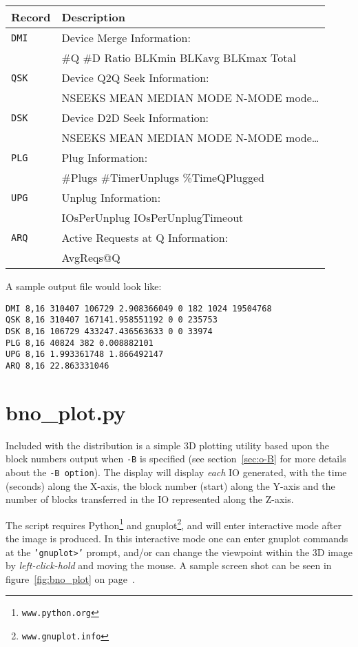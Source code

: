 \documentclass{article}
\begin{document}
  \bigskip
  \begin{tabular}{|l|l|}\hline
  \textbf{Record} & \textbf{Description}\\\hline
  \texttt{DMI}	& Device Merge Information:\\
		& \#Q \#D Ratio BLKmin BLKavg BLKmax Total\\\hline
  \texttt{QSK}	& Device Q2Q Seek Information:\\
		& NSEEKS MEAN MEDIAN MODE N-MODE mode\ldots\\\hline
  \texttt{DSK}	& Device D2D Seek Information:\\
		& NSEEKS MEAN MEDIAN MODE N-MODE mode\ldots\\\hline
  \texttt{PLG}	& Plug Information:\\
		& \#Plugs \#TimerUnplugs \%TimeQPlugged\\\hline
  \texttt{UPG}	& Unplug Information:\\
		& IOsPerUnplug IOsPerUnplugTimeout\\\hline
  \texttt{ARQ}	& Active Requests at Q Information:\\
  		& AvgReqs@Q\\\hline
  \end{tabular}

  \bigskip
  A sample output file would look like:

  \begin{verbatim}
DMI 8,16 310407 106729 2.908366049 0 182 1024 19504768
QSK 8,16 310407 167141.958551192 0 0 235753
DSK 8,16 106729 433247.436563633 0 0 33974
PLG 8,16 40824 382 0.008882101
UPG 8,16 1.993361748 1.866492147
ARQ 8,16 22.863331046
  \end{verbatim}

\newpage\section{\label{sec:bno_plot}bno\_plot.py}

Included with the distribution is a simple 3D plotting utility based
upon the block numbers output when \texttt{-B} is specified (see
section~\ref{sec:o-B} for more details about the \texttt{-B option}). The
display will display \emph{each} IO generated, with the time (seconds)
along the X-axis, the block number (start) along the Y-axis and the
number of blocks transferred in the IO represented along the Z-axis.

The script requires Python\footnote{\texttt{www.python.org}} and
gnuplot\footnote{\texttt{www.gnuplot.info}}, and will enter interactive
mode after the image is produced. In this interactive mode one can enter
gnuplot commands at the \texttt{'gnuplot>'} prompt, and/or can change
the viewpoint within the 3D image by \emph{left-click-hold} and moving
the mouse. A sample screen shot can be seen in figure~\ref{fig:bno_plot} on
page~\pageref{fig:bno_plot}.
\end{document}
